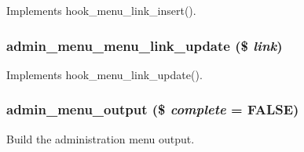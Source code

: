 \label{admin__menu_8module_aa2fdb44794becd942d82791196fb3175}
Implements hook\_\-menu\_\-link\_\-insert(). \hypertarget{admin__menu_8module_adde167e89dea1bccbf8f74d0dd9844a6}{
\subsubsection[{admin\_\-menu\_\-menu\_\-link\_\-update}]{\setlength{\rightskip}{0pt plus 5cm}admin\_\-menu\_\-menu\_\-link\_\-update (\$ {\em link})}}
\label{admin__menu_8module_adde167e89dea1bccbf8f74d0dd9844a6}
Implements hook\_\-menu\_\-link\_\-update(). \hypertarget{admin__menu_8module_a14e66c78d1c76de0b5265d4bdc111cb3}{
\subsubsection[{admin\_\-menu\_\-output}]{\setlength{\rightskip}{0pt plus 5cm}admin\_\-menu\_\-output (\$ {\em complete} = {\ttfamily FALSE})}}
\label{admin__menu_8module_a14e66c78d1c76de0b5265d4bdc111cb3}
Build the administration menu output.


